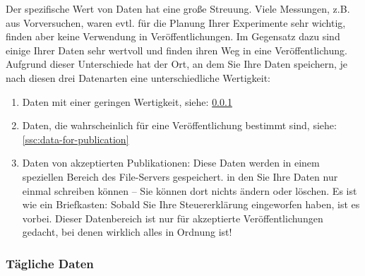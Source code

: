 Der spezifische Wert von Daten hat eine große Streuung. Viele Messungen,
z.B. aus Vorversuchen, waren evtl. für die Planung Ihrer Experimente sehr
wichtig, finden aber keine Verwendung in Veröffentlichungen. Im Gegensatz dazu
sind einige Ihrer Daten sehr wertvoll und finden ihren Weg in eine
Veröffentlichung. Aufgrund dieser Unterschiede hat der Ort, an dem Sie Ihre
Daten speichern, je nach diesen drei Datenarten eine unterschiedliche
Wertigkeit:
\begin{enumerate}[label=\Roman*.]
  \item Daten mit einer geringen Wertigkeit, siehe:
       \ref{ssc:daily-data} 
  \item Daten, die wahrscheinlich für eine Veröffentlichung bestimmt sind,
        siehe:
        \ref{ssc:data-for-publication} 
  \item Daten von akzeptierten Publikationen: Diese Daten werden in einem
        speziellen Bereich des File-Servers gespeichert. in den Sie Ihre Daten nur
        einmal schreiben können – Sie können dort nichts ändern oder löschen.
        Es ist wie ein Briefkasten: Sobald Sie Ihre Steuererklärung eingeworfen
        haben, ist es vorbei. Dieser Datenbereich ist nur für akzeptierte
        Veröffentlichungen gedacht, bei denen wirklich alles in Ordnung ist!
\end{enumerate}

\subsubsection{Tägliche Daten}\label{ssc:daily-data}

